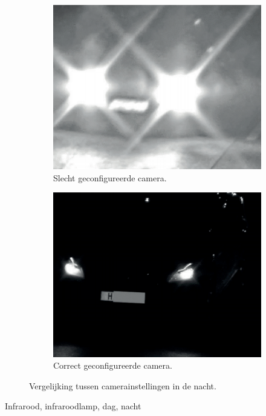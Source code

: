 \begin{figure}[h!]
	\centering
	\begin{subfigure}[b]{0.4\linewidth}
		\includegraphics[width=\linewidth]{img/night-time-lpc-bad.png}
		\caption{Slecht geconfigureerde camera.}
	\end{subfigure}
	\begin{subfigure}[b]{0.4\linewidth}
		\includegraphics[width=\linewidth]{img/night-time-lpc-good.png}
		\caption{Correct geconfigureerde camera.}
	\end{subfigure}
	\label{fig:ntlpc}
	\caption{Vergelijking tussen camerainstellingen in de nacht. \autocite{axis2019license}}
\end{figure}
Infrarood, infraroodlamp, dag, nacht

